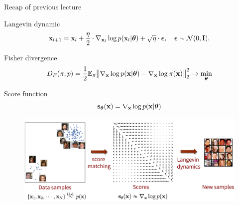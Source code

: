 

\usepackage{tikz}

\usetikzlibrary{arrows,shapes,positioning,shadows,trees}

\begin{frame}
\titlepage
\end{frame}
\begin{frame}{Recap of previous lecture}
	\begin{block}{Langevin dynamic}
		\vspace{-0.3cm}
		\[
			\mathbf{x}_{l + 1} = \mathbf{x}_l + \frac{\eta}{2} \cdot \nabla_{\mathbf{x}_l} \log p(\mathbf{x}_l | \boldsymbol{\theta}) + \sqrt{\eta} \cdot \boldsymbol{\epsilon}, \quad \boldsymbol{\epsilon} \sim \mathcal{N}(0, \mathbf{I}).
		\]
		\vspace{-0.7cm}
	\end{block}
	\begin{block}{Fisher divergence}
		\vspace{-0.3cm}
		\[
			D_F(\pi, p) = \frac{1}{2}\mathbb{E}_{\pi}\bigl\| \nabla_{\mathbf{x}}\log p(\mathbf{x}| \boldsymbol{\theta}) - \nabla_{\mathbf{x}} \log \pi(\mathbf{x}) \bigr\|^2_2 \rightarrow \min_{\boldsymbol{\theta}}
		\]
		\vspace{-0.7cm}
	\end{block}
	\begin{block}{Score function}
		\vspace{-0.5cm}
		 \[
			 \mathbf{s}_{\boldsymbol{\theta}}(\mathbf{x}) = \nabla_{\mathbf{x}}\log p(\mathbf{x}| \boldsymbol{\theta})
		 \]
	 \vspace{-0.8cm}
	\end{block}
	\begin{figure}
		\centering
		\includegraphics[width=0.75\linewidth]{figs/smld}
	\end{figure}
\end{frame}
